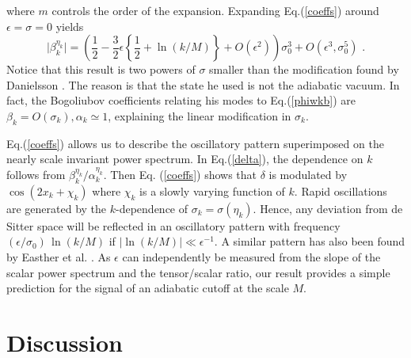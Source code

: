 \documentclass[a4paper,aps,prd,preprint,groupedaddress,nofootinbib]{revtex4}
\begin{document}
where $m$ controls the order of the expansion. Expanding Eq.(\ref{coeffs})
around $\epsilon = \sigma = 0$ yields
\begin{equation}
\label{betaappr}
\vert\beta_k^{\eta_k}\vert = \left(\frac{1}{2} - \frac{3}{2}\epsilon
\left\{ \frac{1}{2}+ \ln(k/M) \right\} + O(\epsilon^2) \right)
\sigma_0^3 + O(\epsilon^3,\sigma_0^5)\,\,.
\end{equation}
Notice that this result is two powers of $\sigma$ smaller 
than the modification found by Danielsson \cite{D02}. The reason
is that the state he used is not the adiabatic vacuum. 
In fact, the Bogoliubov coefficients relating his modes 
to Eq.(\ref{phiwkb}) are $\beta_k= O(\sigma_k), \alpha_k \simeq 1$,
explaining the linear modification in $\sigma_k$.

Eq.(\ref{coeffs}) allows us to describe the oscillatory pattern
superimposed on the nearly scale invariant power spectrum. In
Eq.(\ref{delta}), the dependence on $k$ follows from
$\beta^{\eta_k}_k/\alpha^{\eta_k}_k$.  Then Eq. (\ref{coeffs}) shows
that $\delta$ is modulated by  $\cos(2x_k+ \chi_k)$ where $\chi_k$ 
is a slowly varying function of $k$. Rapid oscillations are generated
by the $k$-dependence of $\sigma_k= \sigma(\eta_k)$. Hence, any
deviation from de Sitter space will be reflected in an oscillatory
pattern  with frequency $(\epsilon/\sigma_0)\, \ln(k/M)$ if $\vert
\ln(k/M)\vert \ll \epsilon^{-1}$. A similar pattern has also been
found by  Easther et al. \cite{Eea01b,Eea02}. As $\epsilon$ can
independently be measured from the slope of the scalar power spectrum
and the tensor/scalar ratio, our result provides a simple prediction
for the signal of an adiabatic cutoff at the scale $M$.

\section{Discussion}
\end{document}
